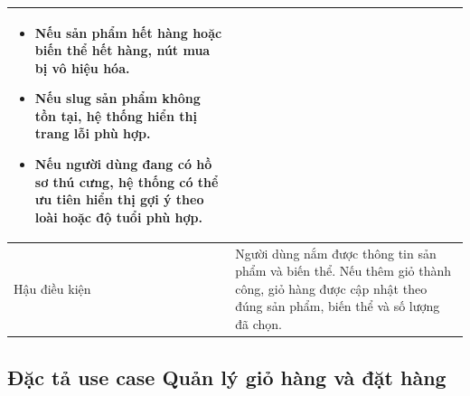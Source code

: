 \documentclass[../DoAn.tex]{subfiles}
\begin{document}
{\begin{longtable}{|p{3.2cm}|p{10.4cm}|}
\begin{minipage}[t]{10.1cm}
\begin{itemize}[leftmargin=*,topsep=0pt,itemsep=0pt]
    \item Nếu sản phẩm hết hàng hoặc biến thể hết hàng, nút mua bị vô hiệu hóa.
    \item Nếu slug sản phẩm không tồn tại, hệ thống hiển thị trang lỗi phù hợp.
    \item Nếu người dùng đang có hồ sơ thú cưng, hệ thống có thể ưu tiên hiển thị gợi ý theo loài hoặc độ tuổi phù hợp.
\end{itemize}
\end{minipage} \\ \hline
Hậu điều kiện & Người dùng nắm được thông tin sản phẩm và biến thể. Nếu thêm giỏ thành công, giỏ hàng được cập nhật theo đúng sản phẩm, biến thể và số lượng đã chọn. \\ \hline
\end{longtable}
}

\subsection{Đặc tả use case Quản lý giỏ hàng và đặt hàng}
\label{subsection:2.3.3}
\end{document}
